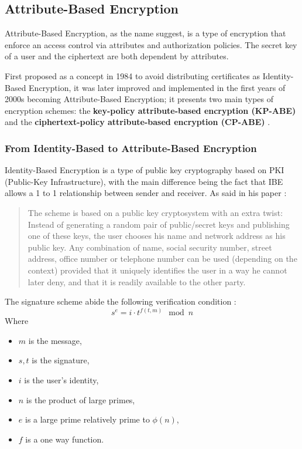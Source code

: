 \subsection{Attribute-Based Encryption}\label{ABE}
Attribute-Based Encryption, as the name suggest, is a type of encryption that enforce an access control via attributes and authorization policies. The secret key of a user and the ciphertext are both dependent by attributes.

First proposed as a concept in 1984 to avoid distributing certificates as Identity-Based Encryption, it was later improved and implemented in the first years of 2000s becoming Attribute-Based Encryption; it presents two main types of encryption schemes: the \textbf{key-policy attribute-based encryption (KP-ABE)} \cite{goyal2006attribute} and the \textbf{ciphertext-policy attribute-based encryption (CP-ABE)} \cite{bethencourt2007ciphertext}.

\subsubsection{From Identity-Based to Attribute-Based Encryption}
Identity-Based Encryption is a type of public key cryptography based on PKI (Public-Key Infrastructure), with the main difference being the fact that IBE allows a 1 to 1 relationship between sender and receiver.
As \citeauthor{shamir1984identity} said in his paper \cite{shamir1984identity}:
\begin{quote}
    The scheme is based on a public key cryptosystem with an extra twist: Instead of generating a random pair of public/secret keys and
publishing one of these keys, the user chooses his name and network address
as his public key. Any combination of name, social security number, street address, office number or telephone number can be used (depending
on the context) provided that it uniquely identifies the user
in a way he cannot later deny, and that it is readily available to the other party.
\end{quote}
The signature scheme abide the following verification condition \cite{shamir1984identity}:
\begin{equation}
    s^e = i \cdot t^{f(t,m)} \mod{n}
\end{equation}
Where 
\begin{itemize}
    \item $m$ is the message,
    \item $s,t$ is the signature,
    \item $i$ is the user's identity,
    \item $n$ is the product of large primes,
    \item $e$ is a large prime relatively prime to $\phi(n)$,
    \item $f$ is a one way function.
\end{itemize}

